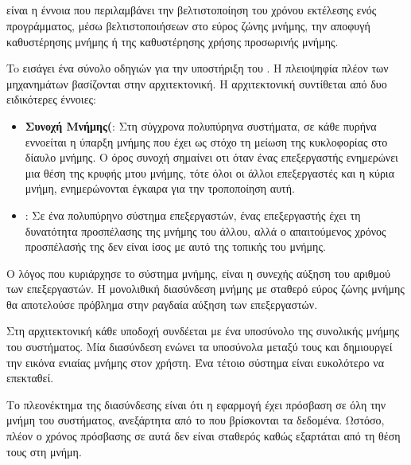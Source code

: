 
\clearpage
\subsection{}
\emph{} είναι η έννοια που περιλαμβάνει την βελτιστοποίηση του χρόνου εκτέλεσης ενός προγράμματος,
μέσω βελτιστοποιήσεων στο εύρος ζώνης μνήμης, την αποφυγή καθυστέρησης μνήμης ή της  καθυστέρησης χρήσης προσωρινής
μνήμης.

To \emph{} εισάγει ένα σύνολο οδηγιών για την υποστήριξη του \emph{}\cite{thread_affinity}. Η πλειοψηφία πλέον των μηχανημάτων βασίζονται στην \emph{} αρχιτεκτονική.
Η \emph{} αρχιτεκτονική συντίθεται από δυο ειδικότερες έννοιες:
\begin{itemize}
\item{
\textbf{Συνοχή Μνήμης(}: Στη σύγχρονα πολυπύρηνα συστήματα, σε κάθε πυρήνα εννοείται η ύπαρξη μνήμης  που έχει ως στόχο τη μείωση της κυκλοφορίας στο δίαυλο μνήμης. Ο όρος συνοχή σημαίνει οτι όταν ένας επεξεργαστής ενημερώνει μια θέση της κρυφής μτου μνήμης, τότε όλοι οι άλλοι επεξεργαστές και η κύρια μνήμη, ενημερώνονται έγκαιρα για την τροποποίηση αυτή\cite{pdblab}.
}

\item{
\textbf{}: Σε ένα πολυπύρηνο σύστημα επεξεργαστών, ένας επεξεργαστής έχει τη δυνατότητα προσπέλασης της μνήμης του άλλου, αλλά ο απαιτούμενος χρόνος προσπέλασής της δεν είναι ίσος με αυτό της τοπικής του μνήμης\cite{pdplab}. 
}
\end{itemize}



Ο λόγος που κυριάρχησε το σύστημα μνήμης, είναι η συνεχής αύξηση του αριθμού των επεξεργαστών. Η μονολιθική
διασύνδεση μνήμης με σταθερό εύρος ζώνης μνήμης θα αποτελούσε πρόβλημα στην ραγδαία αύξηση των επεξεργαστών.

Στη \emph{} αρχιτεκτονική κάθε υποδοχή συνδέεται με ένα υποσύνολο της συνολικής μνήμης του συστήματος. Μία
διασύνδεση ενώνει τα υποσύνολα μεταξύ τους και δημιουργεί την εικόνα ενιαίας μνήμης στον χρήστη. Ένα τέτοιο σύστημα
είναι ευκολότερο να επεκταθεί.

Το πλεονέκτημα της διασύνδεσης είναι ότι η εφαρμογή έχει πρόσβαση σε όλη την μνήμη του συστήματος, ανεξάρτητα από το που
βρίσκονται τα δεδομένα. Ωστόσο, πλέον ο χρόνος πρόσβασης σε αυτά δεν είναι σταθερός καθώς εξαρτάται από τη θέση τους
στη μνήμη.

